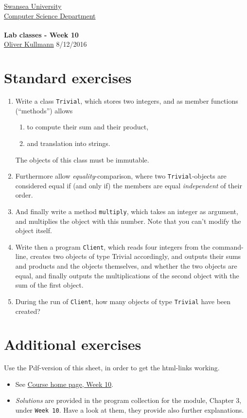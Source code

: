 \documentclass[11pt]{article}
\newcommand{\Java}{\lstset{language=Java,keywordstyle=\bfseries,breaklines,breakindent=30pt}}
\begin{document}
\begin{center}
  \href{http://www.swan.ac.uk/}{Swansea University}\\
  \href{http://www.swan.ac.uk/compsci/}{Computer Science Department}\\[1ex]
  \href{\chp}{\module}\\[1ex]
  \textbf{Lab classes - Week 10}\\
  \href{http://cs.swan.ac.uk/~csoliver}{Oliver Kullmann} 8/12/2016
\end{center}


\section{Standard exercises}
\label{sec:stdex}

\Java

\begin{enumerate}
\item Write a class \texttt{Trivial}, which stores two integers, and as member functions (``methods'') allows
  \begin{enumerate}
  \item to compute their sum and their product,
  \item and translation into strings.
  \end{enumerate}
 The objects of this class must be immutable.
\item Furthermore allow \emph{equality}-comparison, where two \texttt{Trivial}-objects are considered equal if (and only if) the members are equal \emph{independent} of their order.
\item And finally write a method \texttt{multiply}, which takes an integer as argument, and multiplies the object with this number. Note that you can't modify the object itself.
\item Write then a program \texttt{Client}, which reads four integers from the command-line, creates two objects of type Trivial accordingly, and outputs their sums and products and the objects themselves, and whether the two objects are equal, and finally outputs the multiplications of the second object with the sum of the first object.
\item During the run of \texttt{Client}, how many objects of type \texttt{Trivial} have been created?
\end{enumerate}


\section{Additional exercises}
\label{sec:addex}

Use the Pdf-version of this sheet, in order to get the html-links working.
\begin{itemize}
\item See \href{\chp#ExercisesWeek10}{Course home page, Week 10}.
\item \emph{Solutions} are provided in the program collection for the module, Chapter 3, under \texttt{Week 10}. Have a look at them, they provide also further explanations.
\end{itemize}
\end{document}

